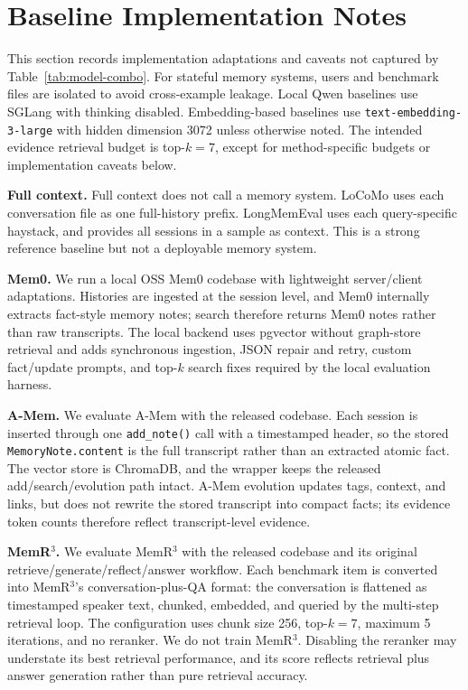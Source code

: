 \section{Baseline Implementation Notes}
\label{app:baseline-implementation-notes}

This section records implementation adaptations and caveats not captured by
Table~\ref{tab:model-combo}. For stateful memory systems, users and benchmark
files are isolated to avoid cross-example leakage. Local Qwen baselines use
SGLang \cite{zheng2023sglang} with thinking disabled. Embedding-based
baselines use \texttt{text-embedding-3-large} with hidden dimension 3072 unless
otherwise noted. The intended evidence retrieval budget is top-\(k=7\), except
for method-specific budgets or implementation caveats below.

\textbf{Full context.}
Full context does not call a memory system. LoCoMo uses each conversation file
as one full-history prefix. LongMemEval uses each query-specific haystack, and
\bench{} provides all sessions in a sample as context. This is a strong
reference baseline but not a deployable memory system.

\textbf{Mem0.}
We run a local OSS Mem0 codebase \cite{chhikara2025mem0} with lightweight
server/client adaptations. Histories are ingested at the session level, and
Mem0 internally extracts fact-style memory notes; search therefore returns
Mem0 notes rather than raw transcripts. The local backend uses pgvector without
graph-store retrieval and adds synchronous ingestion, JSON repair and retry,
custom fact/update prompts, and top-\(k\) search fixes required by the local
evaluation harness.

\textbf{A-Mem.}
We evaluate A-Mem \cite{xu2025amem} with the released codebase. Each session
is inserted through one \texttt{add\_note()} call with a timestamped header, so
the stored \texttt{MemoryNote.content} is the full transcript rather than an
extracted atomic fact. The vector store is ChromaDB, and the wrapper keeps the
released add/search/evolution path intact. A-Mem evolution updates tags,
context, and links, but does not rewrite the stored transcript into compact
facts; its evidence token counts therefore reflect transcript-level evidence.

\textbf{MemR\(^3\).}
We evaluate MemR\(^3\) \cite{du2025memr3} with the released codebase and its
original retrieve/generate/reflect/answer workflow. Each benchmark item is
converted into MemR\(^3\)'s conversation-plus-QA format: the conversation is
flattened as timestamped speaker text, chunked, embedded, and queried by the
multi-step retrieval loop. The configuration uses chunk size 256, top-\(k=7\),
maximum 5 iterations, and no reranker. We do not train MemR\(^3\). Disabling
the reranker may understate its best retrieval performance, and its score
reflects retrieval plus answer generation rather than pure retrieval accuracy.

